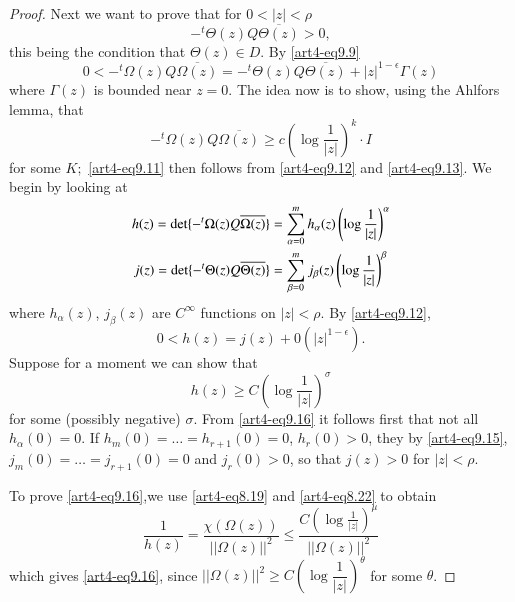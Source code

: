 \begin{proof}
Next we want to prove that for $0 < |z| < \rho$
\begin{equation}
-{}^t \Theta (z) Q \overline{\Theta (z)} > 0, \label{art4-eq9.11}
\end{equation}
this being the condition that $\Theta (z) \in D$. By \eqref{art4-eq9.9}
\begin{equation}
0 < -^t \Omega(z) Q \overline{\Omega(z)} = -^t \Theta (z) Q \overline{\Theta (z)}  + |z|^{1-\epsilon} \Gamma (z) 
\label{art4-eq9.12}
\end{equation}
where $\Gamma (z)$ is bounded near $z =0$. The idea now is to show, using the Ahlfors lemma, that
\begin{equation}
-^t \Omega(z) Q \overline{\Omega(z)} \geqslant c \left(\log \frac{1}{|z|} \right)^k\cdot I
\label{art4-eq9.13}
\end{equation}
for some $K;$ \eqref{art4-eq9.11} then follows from \eqref{art4-eq9.12} and \eqref{art4-eq9.13}. We begin by looking at 
\begin{align}
 h (z) = \det \{-^t \Omega (z) Q \overline{\Omega (z)}\} & = \sum\limits^m_{\alpha = 0} h_\alpha (z) \left(\log \frac{1}{|z|} \right)^\alpha \notag\\
j(z) = \det \{-^t \Theta (z) Q \overline{\Theta (z)}\} & = \sum\limits^m_{\beta =0} j_\beta (z) \left(\log \frac{1}{|z|} \right)^\beta  \label{art4-eq9.14}
\end{align}
where $h_\alpha (z)$, $j_\beta (z)$ are $C^\infty$ functions on $|z| < \rho$. By \eqref{art4-eq9.12},
\begin{equation}
0 < h (z) = j (z) + 0 (|z|^{1-\epsilon}).
\label{art4-eq9.15}
\end{equation}
Suppose for a moment we can show that
\begin{equation}
h (z) \geqslant C \left(\log \frac{1}{|z|} \right)^\sigma
\label{art4-eq9.16}
\end{equation}
for some (possibly negative) $\sigma$. From \eqref{art4-eq9.16} it follows first that not all $h_\alpha (0) = 0$. If $h_m(0) = \ldots = h_{r+1}(0) = 0$, $h_r(0) >0$, they by \eqref{art4-eq9.15}, $j_m (0)= \ldots = j_{r+1} (0) = 0$ and $j_r (0) > 0$, so that $j(z) > 0$ for $|z| < \rho$.

To prove \eqref{art4-eq9.16},\pageoriginale we use \eqref{art4-eq8.19} and \eqref{art4-eq8.22} to obtain
$$
\frac{1}{h(z)} = \frac{\chi (\Omega (z))}{||\Omega (z)||^2} \leqslant \frac{C \left(\log \frac{1}{|z|} \right)^\mu}{||\Omega (z)||^2}
$$
which gives \eqref{art4-eq9.16}, since $||\Omega (z)||^2 \geqslant C \left(\log \dfrac{1}{|z|} \right)^\theta$ for some $\theta$.


\end{proof}
